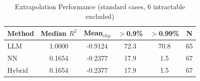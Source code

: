 \begin{table}[h]\centering
\begin{tabular}{lccccc}\hline
Method & Median $R^2$ & Mean$_{clip}$ & $>$0.9\% & $>$0.99\% & N \\\hline
LLM    & 1.0000 & -0.9124 & 72.3 & 70.8 & 65 \\
NN     & 0.1654 & -0.2377 & 17.9 & 1.5 & 67 \\
Hybrid & 0.1654 & -0.2377 & 17.9 & 1.5 & 67 \\
\hline\end{tabular}
\caption{Extrapolation Performance (standard cases, 6 intractable excluded)}
\end{table}
